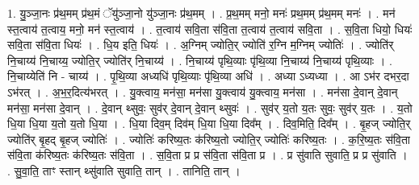 \documentclass[17pt]{extarticle}
\begin{document}
1. यु॒ञ्जा॒नः प्र॑थ॒मम् प्र॑थ॒मं ॅयु॑ञ्जा॒नो यु॑ञ्जा॒नः प्र॑थ॒मम् । . प्र॒थ॒मम् मनो॒ मनः॑ प्रथ॒मम् प्र॑थ॒मम् मनः॑ । . मन॑ स्त॒त्वाय॑ त॒त्वाय॒ मनो॒ मन॑ स्त॒त्वाय॑ । . त॒त्वाय॑ सवि॒ता स॑वि॒ता त॒त्वाय॑ त॒त्वाय॑ सवि॒ता । . स॒वि॒ता धियो॒ धियः॑ सवि॒ता स॑वि॒ता धियः॑ । . धि॒य इति॒ धियः॑ । . अ॒ग्निम् ज्योति॒र् ज्योति॑ र॒ग्नि म॒ग्निम् ज्योतिः॑ । . ज्योति॑र् नि॒चाय्य॑ नि॒चाय्य॒ ज्योति॒र् ज्योति॑र् नि॒चाय्य॑ । . नि॒चाय्य॑ पृथि॒व्याः पृ॑थि॒व्या नि॒चाय्य॑ नि॒चाय्य॑ पृथि॒व्याः । . नि॒चाय्येति॑ नि - चाय्य॑ । . पृ॒थि॒व्या अध्यधि॑ पृथि॒व्याः पृ॑थि॒व्या अधि॑ । . अध्या ऽध्यध्या । . आ ऽभ॑र दभर॒दा ऽभ॑रत् । . अ॒भ॒र॒दित्य॑भरत् । . यु॒क्त्वाय॒ मन॑सा॒ मन॑सा यु॒क्त्वाय॑ यु॒क्त्वाय॒ मन॑सा । . मन॑सा दे॒वान् दे॒वान् मन॑सा॒ मन॑सा दे॒वान् । . दे॒वान् थ्सुवः॒ सुव॑र् दे॒वान् दे॒वान् थ्सुवः॑ । . सुव॑र् य॒तो य॒तः सुवः॒ सुव॑र् य॒तः । . य॒तो धि॒या धि॒या य॒तो य॒तो धि॒या । . धि॒या दिव॒म् दिव॑म् धि॒या धि॒या दिव᳚म् । . दिव॒मिति॒ दिव᳚म् । . बृ॒हज् ज्योति॒र् ज्योति॑र् बृ॒हद् बृ॒हज् ज्योतिः॑ । . ज्योतिः॑ करिष्य॒तः क॑रिष्य॒तो ज्योति॒र् ज्योतिः॑ करिष्य॒तः । . क॒रि॒ष्य॒तः स॑वि॒ता स॑वि॒ता क॑रिष्य॒तः क॑रिष्य॒तः स॑वि॒ता । . स॒वि॒ता प्र प्र स॑वि॒ता स॑वि॒ता प्र । . प्र सु॑वाति सुवाति॒ प्र प्र सु॑वाति । . सु॒वा॒ति॒ ताꣳ स्तान् थ्सु॑वाति सुवाति॒ तान् । . तानिति॒ तान् । \newline
\end{document}
